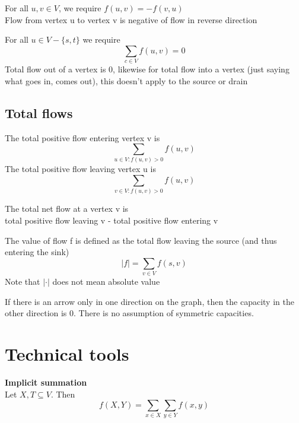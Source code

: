 \documentclass{article}[18pt]
\begin{document}
\begin{defin}
	For all $u,v\in V$, we require $f(u,v)=-f(v,u)$\\
	Flow from vertex u to vertex v is negative of flow in reverse direction
\end{defin}
\newpage
\begin{defin}
For all $u\in V - \{s,t\}$ we require
$$\sum_{c\in V}f(u,v)=0$$
Total flow out of a vertex is 0, likewise for total flow into a vertex (just saying what goes in, comes out), this doesn't apply to the source or drain
\end{defin}
\subsection{Total flows}
\begin{defin}
The total positive flow entering vertex v is
$$\sum_{u\in V: f(u,v)>0}f(u,v)$$
The total positive flow leaving vertex u is
$$\sum_{v\in V: f(u,v)>0}f(u,v)$$
\end{defin}

\begin{defin}
	The total net flow at a vertex v is\\
	total positive flow leaving v - total positive flow entering v
\end{defin}

\begin{defin}
	The value of flow f is defined as the total flow leaving the source (and thus entering the sink)
	$$|f|=\sum_{v\in V}f(s,v)$$
	Note that $|\cdot|$ does not mean absolute value
\end{defin}
If there is an arrow only in one direction on the graph, then the capacity in the other direction is 0. There is no assumption of symmetric capacities.
\section{Technical tools}
\textbf{Implicit summation}\\
Let $X,T\subseteq V$. Then
\[
f(X, Y)=\sum_{x \in X} \sum_{y \in Y} f(x, y)
\]
\end{document}
